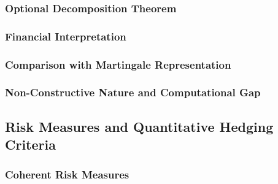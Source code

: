 \subsubsection{Optional Decomposition Theorem}

%


\subsubsection{Financial Interpretation}

%


\subsubsection{Comparison with Martingale Representation}

%


\subsubsection{Non-Constructive Nature and Computational Gap}

%



\subsection{Risk Measures and Quantitative Hedging Criteria}
\label{subsec:risk_measures}

\subsubsection{Coherent Risk Measures}

